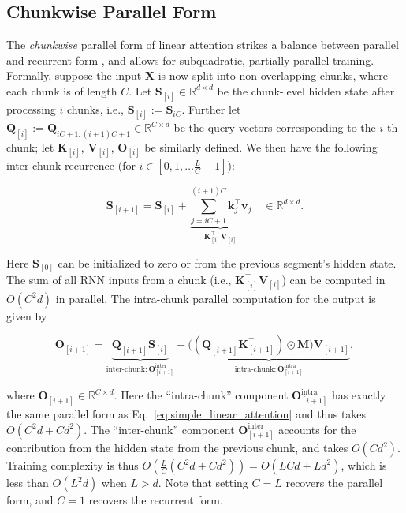 \subsection{Chunkwise Parallel Form} 

\label{background:lin-chunkwise}

The \emph{chunkwise} parallel form of linear attention  strikes a balance between parallel and recurrent form \cite{GAU,sun2023retentive}, and allows for subquadratic, partially parallel training. Formally, suppose the input ${\mathbf{X}}$ is now split into non-overlapping chunks, where each chunk is of length $C$. Let ${\mathbf{S}}_{[i]} \in \mathbb{R}^{d \times d}$ be the chunk-level hidden state after processing $i$ chunks, i.e., ${\mathbf{S}}_{[i]}:={\mathbf{S}}_{iC}$. Further let ${\mathbf{Q}}_{[i]}:={\mathbf{Q}}_{iC+1:(i+1)C+1} \in \mathbb{R}^{C\times d}$ be the query vectors corresponding to the $i$-th chunk; let ${\mathbf{K}}_{[i]}$, ${\mathbf{V}}_{[i]}$, ${\mathbf{O}}_{[i]}$ be similarly defined. We then have the following inter-chunk recurrence (for $i \in [0, 1, \dots \frac{L}{C}-1]$):

\begin{equation}
{\mathbf{S}}_{[i+1]} = {\mathbf{S}}_{[i]} + \underbrace{\sum_{j=iC + 1}^{(i+1)C} {\bm{k}}_{j}^\intercal {\bm{v}}_{j}}_{{\mathbf{K}}^\intercal_{[i]}{\mathbf{V}}_{[i]}} \quad  \in \mathbb{R}^{d\times d}.
\label{eq:la-inter-chunk}
    \end{equation}

Here  ${\mathbf{S}}_{[0]}$ can be initialized to  zero or from the previous segment's hidden state. The sum of all RNN inputs from a chunk (i.e., ${\mathbf{K}}^\intercal_{[i]}{\mathbf{V}}_{[i]}$) can be computed in $O(C^2d)$ in parallel. The intra-chunk parallel computation for the output is given by

\begin{equation*}    
{\mathbf{O}}_{[i+1]} = \underbrace{{\mathbf{Q}}_{[i+1]}{\mathbf{S}}_{[i]}}_{\text{inter-chunk}: {\mathbf{O}}^\text{inter}_{[i+1]}} + \underbrace{\big(({\mathbf{Q}}_{[i+1]}{\mathbf{K}}_{[i+1]}^{\intercal})\odot{\mathbf{M}}\big){\mathbf{V}}_{[i+1]}}_{\text{intra-chunk}: {\mathbf{O}}^{\text{intra}}_{[i+1]}},
\label{eq:la_block_wise}
\end{equation*}

where ${\mathbf{O}}_{[i+1]} \in \mathbb{R}^{C\times d}$. Here the ``intra-chunk'' component ${\mathbf{O}}^\text{intra}_{[i+1]}$  has exactly the same parallel form as Eq.~\ref{eq:simple_linear_attention} and thus takes $O(C^2d + Cd^2)$. The ``inter-chunk'' component ${\mathbf{O}}^\text{inter}_{[i+1]}$ accounts for the contribution from the hidden state from the previous chunk, and takes $O(Cd^2)$. Training complexity is thus  $O\left(\frac{L}{C}(C^2d + Cd^2) \right)=O(LCd+Ld^2)$, which is less than $O(L^2d)$ when $L>d$.  Note that setting $C = L$ recovers the parallel form, and $C=1$ recovers the recurrent form.

